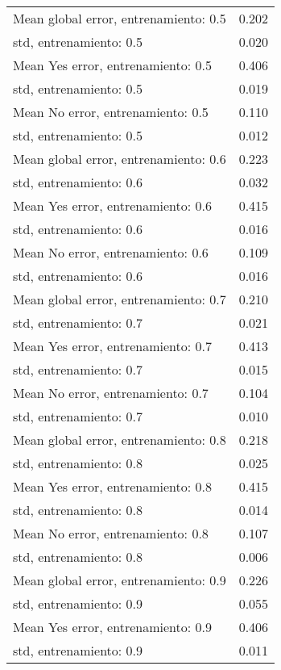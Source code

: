 \begin{longtable}{p{4cm}|p{1.5cm}}
Mean global error, entrenamiento: 0.5 &        0.202 \\
std, entrenamiento: 0.5               &        0.020 \\
Mean Yes error, entrenamiento: 0.5    &        0.406 \\
std, entrenamiento: 0.5               &        0.019 \\
Mean No error, entrenamiento: 0.5     &        0.110 \\
std, entrenamiento: 0.5               &        0.012 \\
Mean global error, entrenamiento: 0.6 &        0.223 \\
std, entrenamiento: 0.6               &        0.032 \\
Mean Yes error, entrenamiento: 0.6    &        0.415 \\
std, entrenamiento: 0.6               &        0.016 \\
Mean No error, entrenamiento: 0.6     &        0.109 \\
std, entrenamiento: 0.6               &        0.016 \\
Mean global error, entrenamiento: 0.7 &        0.210 \\
std, entrenamiento: 0.7               &        0.021 \\
Mean Yes error, entrenamiento: 0.7    &        0.413 \\
std, entrenamiento: 0.7               &        0.015 \\
Mean No error, entrenamiento: 0.7     &        0.104 \\
std, entrenamiento: 0.7               &        0.010 \\
Mean global error, entrenamiento: 0.8 &        0.218 \\
std, entrenamiento: 0.8               &        0.025 \\
Mean Yes error, entrenamiento: 0.8    &        0.415 \\
std, entrenamiento: 0.8               &        0.014 \\
Mean No error, entrenamiento: 0.8     &        0.107 \\
std, entrenamiento: 0.8               &        0.006 \\
Mean global error, entrenamiento: 0.9 &        0.226 \\
std, entrenamiento: 0.9               &        0.055 \\
Mean Yes error, entrenamiento: 0.9    &        0.406 \\
std, entrenamiento: 0.9               &        0.011 \\

\end{longtable}
